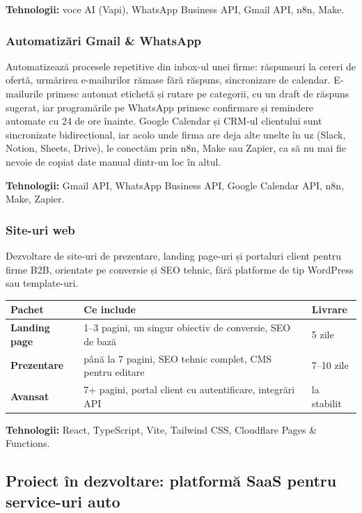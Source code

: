 \documentclass[11pt, a4paper]{article}
\begin{document}
\textbf{Tehnologii:} voce AI (Vapi), WhatsApp Business API, Gmail API, n8n, Make.

\subsubsection{Automatizări Gmail \& WhatsApp}

Automatizează procesele repetitive din inbox-ul unei firme: răspunsuri la cereri de ofertă,
urmărirea e-mailurilor rămase fără răspuns, sincronizare de calendar. E-mailurile primesc automat
etichetă și rutare pe categorii, cu un draft de răspuns sugerat, iar programările pe WhatsApp
primesc confirmare și remindere automate cu 24 de ore înainte. Google Calendar și CRM-ul clientului
sunt sincronizate bidirecțional, iar acolo unde firma are deja alte unelte în uz (Slack, Notion,
Sheets, Drive), le conectăm prin n8n, Make sau Zapier, ca să nu mai fie nevoie de copiat date
manual dintr-un loc în altul.

\textbf{Tehnologii:} Gmail API, WhatsApp Business API, Google Calendar API, n8n, Make, Zapier.

\subsubsection{Site-uri web}

Dezvoltare de site-uri de prezentare, landing page-uri și portaluri client pentru firme B2B,
orientate pe conversie și SEO tehnic, fără platforme de tip WordPress sau template-uri.

\renewcommand{\arraystretch}{1.3}
\begin{tabularx}{\textwidth}{>{\bfseries}l X l}
\toprule
Pachet & Ce include & Livrare \\
\midrule
Landing page & 1--3 pagini, un singur obiectiv de conversie, SEO de bază & 5 zile \\
Prezentare & până la 7 pagini, SEO tehnic complet, CMS pentru editare & 7--10 zile \\
Avansat & 7+ pagini, portal client cu autentificare, integrări API & la stabilit \\
\bottomrule
\end{tabularx}

\textbf{Tehnologii:} React, TypeScript, Vite, Tailwind CSS, Cloudflare Pages \& Functions.

\vspace{1em}
\subsection{Proiect în dezvoltare: platformă SaaS pentru service-uri auto}
\end{document}
